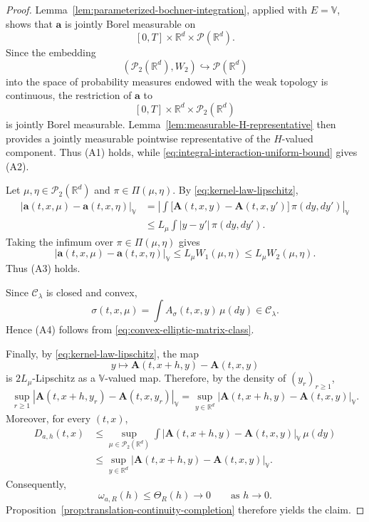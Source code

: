 \documentclass[12pt,oneside, reqno]{amsart}
\numberwithin{equation}{section}
\begin{document}
\begin{proof}
	Lemma~\ref{lem:parameterized-bochner-integration}, applied with
	\(E=\mathbb V\), shows that \(\mathbf a\) is jointly Borel measurable on
	\[
	[0,T]\times\mathbb R^d\times\mathcal P(\mathbb R^d).
	\]
	Since the embedding
	\[
	(\mathcal P_2(\mathbb R^d),W_2)
	\hookrightarrow
	\mathcal P(\mathbb R^d)
	\]
	into the space of probability measures endowed with the weak topology
	is continuous, the restriction of \(\mathbf a\) to
	\[
	[0,T]\times\mathbb R^d\times\mathcal P_2(\mathbb R^d)
	\]
	is jointly Borel measurable. Lemma~\ref{lem:measurable-H-representative}
	then provides a jointly measurable pointwise representative of the
	\(H\)-valued component. Thus \textnormal{(A1)} holds, while
	\eqref{eq:integral-interaction-uniform-bound} gives
	\textnormal{(A2)}.
	
	Let \(\mu,\eta\in\mathcal P_2(\mathbb R^d)\) and
	\(\pi\in\Pi(\mu,\eta)\). By
	\eqref{eq:kernel-law-lipschitz},
	\begin{align*}
		\left|
		\mathbf a(t,x,\mu)
		-
		\mathbf a(t,x,\eta)
		\right|_{\mathbb V}
		&=
		\left|
		\int
		\bigl[
		\mathbf A(t,x,y)
		-
		\mathbf A(t,x,y')
		\bigr]
		\,\pi(dy,dy')
		\right|_{\mathbb V}
		\\
		&\leq
		L_\mu
		\int
		|y-y'|
		\,\pi(dy,dy').
	\end{align*}
	Taking the infimum over
	\(\pi\in\Pi(\mu,\eta)\) gives
	\[
	\left|
	\mathbf a(t,x,\mu)
	-
	\mathbf a(t,x,\eta)
	\right|_{\mathbb V}
	\leq
	L_\mu W_1(\mu,\eta)
	\leq
	L_\mu W_2(\mu,\eta).
	\]
	Thus \textnormal{(A3)} holds.
	
	Since \(\mathcal C_\lambda\) is closed and convex,
	\[
	\sigma(t,x,\mu)
	=
	\int
	A_\sigma(t,x,y)\,\mu(dy)
	\in
	\mathcal C_\lambda.
	\]
	Hence \textnormal{(A4)} follows from
	\eqref{eq:convex-elliptic-matrix-class}.
	
	Finally, by \eqref{eq:kernel-law-lipschitz}, the map
	\[
	y
	\longmapsto
	\mathbf A(t,x+h,y)
	-
	\mathbf A(t,x,y)
	\]
	is \(2L_\mu\)-Lipschitz as a \(\mathbb V\)-valued map. Therefore,
	by the density of \((y_r)_{r\geq1}\),
	\[
	\sup_{r\geq1}
	\left|
	\mathbf A(t,x+h,y_r)
	-
	\mathbf A(t,x,y_r)
	\right|_{\mathbb V}
	=
	\sup_{y\in\mathbb R^d}
	\left|
	\mathbf A(t,x+h,y)
	-
	\mathbf A(t,x,y)
	\right|_{\mathbb V}.
	\]
	Moreover, for every \((t,x)\),
	\begin{align*}
		D_{a,h}(t,x)
		&\leq
		\sup_{\mu\in\mathcal P_2(\mathbb R^d)}
		\int
		\left|
		\mathbf A(t,x+h,y)
		-
		\mathbf A(t,x,y)
		\right|_{\mathbb V}
		\,\mu(dy)
		\\
		&\leq
		\sup_{y\in\mathbb R^d}
		\left|
		\mathbf A(t,x+h,y)
		-
		\mathbf A(t,x,y)
		\right|_{\mathbb V}.
	\end{align*}
	Consequently,
	\[
	\omega_{a,R}(h)
	\leq
	\Theta_R(h)
	\longrightarrow0
	\qquad
	\text{as }h\to0.
	\]
	Proposition~\ref{prop:translation-continuity-completion} therefore
	yields the claim.
\end{proof}
	
\end{document}
